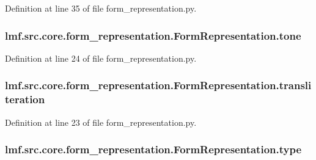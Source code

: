 Definition at line 35 of file form\+\_\+representation.\+py.

\hypertarget{classlmf_1_1src_1_1core_1_1form__representation_1_1_form_representation_a2cfea0271f8abfcffb74afb7641ef4df}{
\subsubsection[{tone}]{\setlength{\rightskip}{0pt plus 5cm}lmf.\+src.\+core.\+form\+\_\+representation.\+Form\+Representation.\+tone}}\label{classlmf_1_1src_1_1core_1_1form__representation_1_1_form_representation_a2cfea0271f8abfcffb74afb7641ef4df}


Definition at line 24 of file form\+\_\+representation.\+py.

\hypertarget{classlmf_1_1src_1_1core_1_1form__representation_1_1_form_representation_ab192387108c3c4e780297d1b409d5eff}{
\subsubsection[{transliteration}]{\setlength{\rightskip}{0pt plus 5cm}lmf.\+src.\+core.\+form\+\_\+representation.\+Form\+Representation.\+transliteration}}\label{classlmf_1_1src_1_1core_1_1form__representation_1_1_form_representation_ab192387108c3c4e780297d1b409d5eff}


Definition at line 23 of file form\+\_\+representation.\+py.

\hypertarget{classlmf_1_1src_1_1core_1_1form__representation_1_1_form_representation_a26785ac6e2bf05ebefb60d1c019db55d}{
\subsubsection[{type}]{\setlength{\rightskip}{0pt plus 5cm}lmf.\+src.\+core.\+form\+\_\+representation.\+Form\+Representation.\+type}}\label{classlmf_1_1src_1_1core_1_1form__representation_1_1_form_representation_a26785ac6e2bf05ebefb60d1c019db55d}



